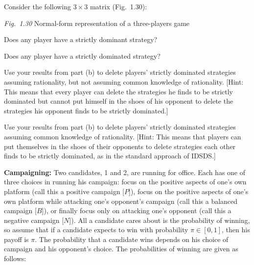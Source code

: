 Consider the following $3 \times 3$ matrix (Fig.~1.30):
\vspace{-6pt}\begin{center}\small\textit{Fig.~1.30} Normal-form representation of a three-players game\end{center}
\begin{partes}
\item Does any player have a strictly dominant strategy?
\item Does any player have a strictly dominated strategy?
\item Use your results from part (b) to delete players' strictly dominated strategies assuming
rationality, but not assuming common knowledge of rationality. [Hint: This means that every player
can delete the strategies he finds to be strictly dominated but cannot put himself in the shoes of
his opponent to delete the strategies his opponent finds to be strictly dominated.]
\item Use your results from part (b) to delete players' strictly dominated strategies assuming
common knowledge of rationality. [Hint: This means that players can put themselves in the shoes of
their opponents to delete strategies each other finds to be strictly dominated, as in the standard
approach of IDSDS.]
\end{partes}
\resolespaco


\textbf{Campaigning:} Two candidates, 1 and 2, are running for office. Each has one of
three choices in running his campaign: focus on the positive aspects of one's own platform (call
this a positive campaign [$P$]), focus on the positive aspects of one's own platform while
attacking one's opponent's campaign (call this a balanced campaign [$B$]), or finally focus only on
attacking one's opponent (call this a negative campaign [$N$]). All a candidate cares about is the
probability of winning, so assume that if a candidate expects to win with probability
$\pi \in [0, 1]$, then his payoff is $\pi$. The probability that a candidate wins depends on his
choice of campaign and his opponent's choice. The probabilities of winning are given as follows:

